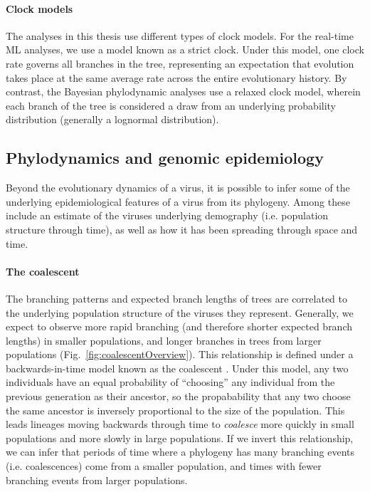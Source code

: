 \paragraph*{Clock models}
The analyses in this thesis use different types of clock models.
For the real-time ML analyses, we use a model known as a strict clock.
Under this model, one clock rate governs all branches in the tree, representing an expectation that evolution takes place at the same average rate across the entire evolutionary history.
By contrast, the Bayesian phylodynamic analyses use a relaxed clock model, wherein each branch of the tree is considered a draw from an underlying probability distribution (generally a lognormal distribution).

\subsection{Phylodynamics and genomic epidemiology}\label{ssec:phylodynamics}
Beyond the evolutionary dynamics of a virus, it is possible to infer some of the underlying epidemiological features of a virus from its phylogeny.
Among these include an estimate of the viruses underlying demography (i.e. population structure through time), as well as how it has been spreading through space and time.

\paragraph*{The coalescent}
The branching patterns and expected branch lengths of trees are correlated to the underlying population structure of the viruses they represent.
Generally, we expect to observe more rapid branching (and therefore shorter expected branch lengths) in smaller populations, and longer branches in trees from larger populations (Fig.~\ref{fig:coalescentOverview}).
This relationship is defined under a backwards-in-time model known as the coalescent \citep{kingman1982coalescent,kingman1982genealogy}.
Under this model, any two individuals have an equal probability of ``choosing'' any individual from the previous generation as their ancestor, so the propabability that any two choose the same ancestor is inversely proportional to the size of the population.
This leads lineages moving backwards through time to \textit{coalesce} more quickly in small populations and more slowly in large populations.
If we invert this relationship, we can infer that periods of time where a phylogeny has many branching events (i.e. coalescences) come from a smaller population, and times with fewer branching events from larger populations.

